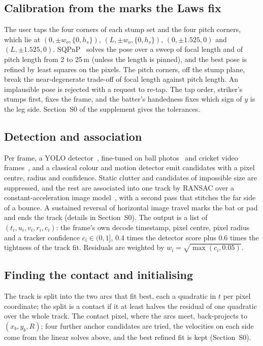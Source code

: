 \documentclass[journal]{IEEEtran}
\begin{document}
\subsection{Calibration from the marks the Laws fix}

The user taps the four corners of each stump set and the four pitch corners, which lie at
$(0, \pm w_o, \{0, h_s\})$, $(L, \pm w_o, \{0, h_s\})$, $(0, \pm 1.525, 0)$ and $(L, \pm 1.525, 0)$.
SQPnP~\cite{terzakis2020sqpnp} solves the pose over a sweep of focal length and of pitch
length from 2 to 25\,m (unless the length is pinned), and the best pose is refined by least squares on the pixels. The pitch corners, off
the stump plane, break the near-degenerate trade-off of focal length against pitch length. An implausible pose is
rejected with a request to re-tap. The tap order, striker's stumps first, fixes the frame, and the
batter's handedness fixes which sign of $y$ is the leg side. Section~S0 of the supplement gives the tolerances.

\subsection{Detection and association}

Per frame, a YOLO detector~\cite{jocher2023ultralytics}, fine-tuned on ball photos~\cite{kuznetsova2020open,
lin2014coco} and cricket video frames~\cite{rfcricv2,rftracker}, and a classical colour and motion detector
emit candidates with a pixel centre, radius and confidence. Static clutter and candidates of impossible size
are suppressed, and the rest are associated into one track by RANSAC over a constant-acceleration image
model~\cite{fischler1981ransac}, with a second pass that stitches the far side of a bounce. A sustained
reversal of horizontal image travel marks the bat or pad and ends the track (details in Section~S0). The
output is a list of $(t_i, u_i, v_i, r_i, c_i)$: the frame's own decode timestamp, pixel centre, pixel
radius and a tracker confidence $c_i \in (0, 1]$, 0.4 times the detector score plus 0.6 times the
tightness of the track fit. Residuals are weighted by $w_i = \sqrt{\max(c_i, 0.05)}$.

\subsection{Finding the contact and initialising}

The track is split into the two arcs that fit best, each a quadratic in $t$ per pixel
coordinate; the split is a contact if it at least halves the residual of one quadratic over the whole track. The contact pixel,
where the arcs meet, back-projects to $(x_b, y_b, R)$; four further anchor candidates are tried, the
velocities on each side come from the linear solves above, and the best refined fit is kept (Section~S0).
\end{document}
